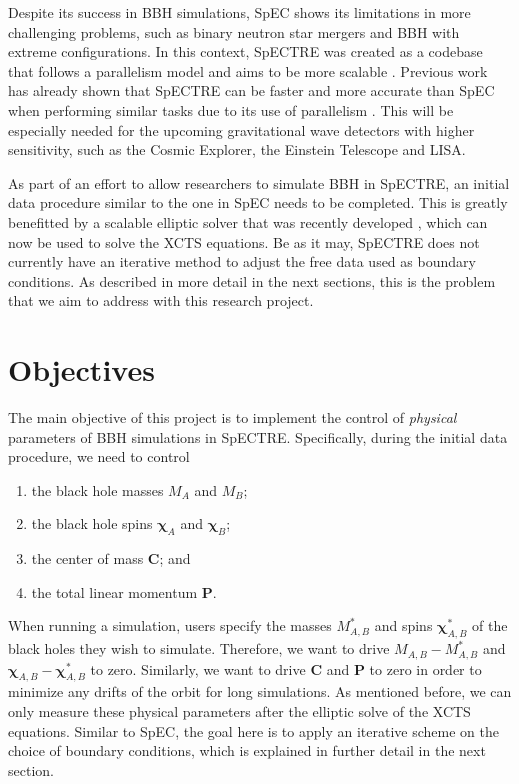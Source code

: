 \documentclass{../document}
\renewcommand{\v}[1]{\boldsymbol{#1}}
\begin{document}
	Despite its success in BBH simulations, SpEC shows its limitations in more challenging problems, such as binary neutron star mergers and BBH with extreme configurations. In this context, SpECTRE \cite{SpECTRE} was created as a codebase that follows a parallelism model and aims to be more scalable \cite{Kidder}. Previous work has already shown that SpECTRE can be faster and more accurate than SpEC when performing similar tasks due to its use of parallelism \cite{Vu}. This will be especially needed for the upcoming gravitational wave detectors with higher sensitivity, such as the Cosmic Explorer, the Einstein Telescope and LISA.
	
	As part of an effort to allow researchers to simulate BBH in SpECTRE, an initial data procedure similar to the one in SpEC needs to be completed. This is greatly benefitted by a scalable elliptic solver that was recently developed \cite{Vu}, which can now be used to solve the XCTS equations. Be as it may, SpECTRE does not currently have an iterative method to adjust the free data used as boundary conditions. As described in more detail in the next sections, this is the problem that we aim to address with this research project.

	\section{Objectives}

	The main objective of this project is to implement the control of \textit{physical} parameters of BBH simulations in SpECTRE. Specifically, during the initial data procedure, we need to control
	\begin{enumerate}
		\item the black hole masses $M_A$ and $M_B$;
		\item the black hole spins $\v \chi_A$ and $\v \chi_B$;
		\item the center of mass $\v C$; and
		\item the total linear momentum $\v P$.
	\end{enumerate}
	
	When running a simulation, users specify the masses $M_{A,B}^*$ and spins $\v \chi_{A,B}^*$ of the black holes they wish to simulate. Therefore, we want to drive $M_{A,B} - M_{A,B}^*$ and $\v \chi_{A,B} - \v \chi_{A,B}^*$ to zero. Similarly, we want to drive $\v C$ and $\v P$ to zero in order to minimize any drifts of the orbit for long simulations. As mentioned before, we can only measure these physical parameters after the elliptic solve of the XCTS equations. Similar to SpEC, the goal here is to apply an iterative scheme on the choice of boundary conditions, which is explained in further detail in the next section.
\end{document}
